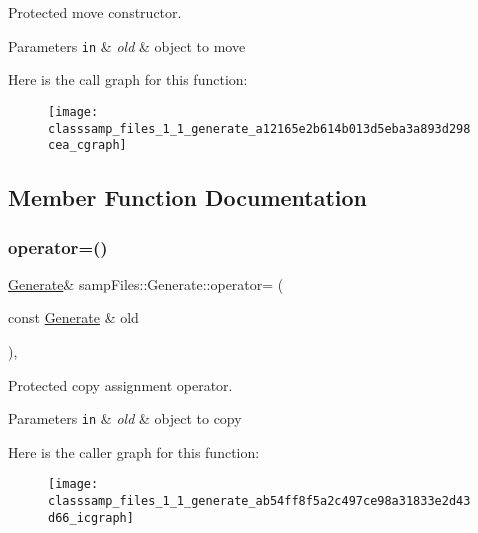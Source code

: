 Protected move constructor. 


\begin{DoxyParams}[1]{Parameters}
\mbox{\tt in}  & {\em old} & object to move \\
\hline
\end{DoxyParams}
Here is the call graph for this function\+:\nopagebreak
\begin{figure}[H]
\begin{center}
\leavevmode
\texttt{[image: classsamp\_files\_1\_1\_generate\_a12165e2b614b013d5eba3a893d298cea\_cgraph]}
\end{center}
\end{figure}


\subsection{Member Function Documentation}
\mbox{\label{classsamp_files_1_1_generate_ab54ff8f5a2c497ce98a31833e2d43d66}} 
\subsubsection{\texorpdfstring{operator=()}{operator=()}\hspace{0.1cm}{\footnotesize\ttfamily [1/2]}}
{\footnotesize\ttfamily \hyperlink{classsamp_files_1_1_generate}{Generate}\& samp\+Files\+::\+Generate\+::operator= (\begin{DoxyParamCaption}\item[{const \hyperlink{classsamp_files_1_1_generate}{Generate} \&}]{old }\end{DoxyParamCaption})\hspace{0.3cm}{\ttfamily [protected]}, {\ttfamily [default]}}



Protected copy assignment operator. 


\begin{DoxyParams}[1]{Parameters}
\mbox{\tt in}  & {\em old} & object to copy \\
\hline
\end{DoxyParams}
Here is the caller graph for this function\+:\nopagebreak
\begin{figure}[H]
\begin{center}
\leavevmode
\texttt{[image: classsamp\_files\_1\_1\_generate\_ab54ff8f5a2c497ce98a31833e2d43d66\_icgraph]}
\end{center}
\end{figure}
\mbox{\label{classsamp_files_1_1_generate_a7b7e395a2d6fe5235fe72f7bbc50e2a6}} 

